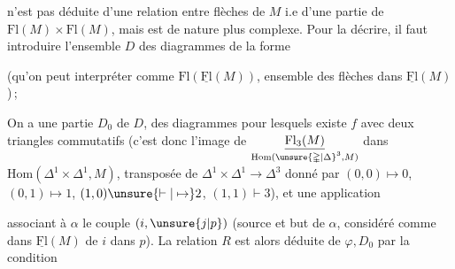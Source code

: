 n'est pas déduite d'une relation entre flèches de $M$ i.e d'une partie de $\mathrm{Fl}(M)\times\mathrm{Fl}(M)$, mais est de nature plus complexe. Pour la décrire, il faut introduire l'ensemble $D$ des diagrammes  de la forme


(qu'on peut interpréter comme $\mathrm{Fl}(\underline{\mathrm{Fl}}(M))$, ensemble des flèches dans $\underline{\mathrm{Fl}}(M)$)\,;

On a une partie $D_0$ de $D$,  des diagrammes pour lesquels existe $f$ avec deux triangles commutatifs (c'est donc l'image de $\underset{\mathrm{Hom}(\unsure{\mathbb{\Delta}|\Delta}^{3},M)}{\underline{\mathrm{Fl}_3(M)}}$ dans $\mathrm{Hom}(\mathbb{\Delta}^1\times\mathbb{\Delta}^1,M)$, transposée de $\mathbb{\Delta}^1\times\mathbb{\Delta}^1\longrightarrow\mathbb{\Delta}^3$ donné par $(0,0)\mapsto0$, $(0,1)\mapsto1$, $(1,0)\unsure{\vdash|\mapsto}2$, $(1,1)\vdash3$), et une application


associant à $\alpha$ le couple $(i,\unsure{j|p})$ (source et but de $\alpha$, considéré comme  dans $\underline{\mathrm{Fl}}(M)$ de $i$ dans $p$). La relation $R$ est alors déduite de $\varphi,D_0$ par la condition

